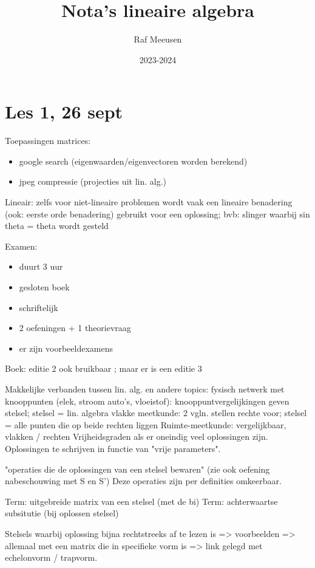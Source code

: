 \documentclass{article}
\title{Nota's lineaire algebra}
\author{Raf Meeusen}
\date{2023-2024}
\begin{document}
\maketitle

\section{Les 1, 26 sept}

Toepassingen matrices: 
\begin{itemize}
\item google search (eigenwaarden/eigenvectoren worden berekend) 
\item jpeg compressie (projecties uit lin. alg.) 
\end{itemize}


Lineair: zelfs voor niet-lineaire problemen wordt vaak een lineaire benadering (ook: eerste orde benadering) gebruikt voor een oplossing; bvb: slinger waarbij sin theta = theta wordt gesteld

Examen: 
\begin{itemize}
\item duurt 3 uur
\item gesloten boek
\item schriftelijk
\item 2 oefeningen + 1 theorievraag
\item er zijn voorbeeldexamens 
\end{itemize}



Boek: editie 2 ook bruikbaar ; maar er is een editie 3 

Makkelijke verbanden tussen lin. alg. en andere topics: 
fysisch netwerk met knooppunten (elek, stroom auto's, vloeistof): knooppuntvergelijkingen geven stelsel; stelsel = lin. algebra
vlakke meetkunde: 2 vgln. stellen rechte voor; stelsel = alle punten die op beide rechten liggen
Ruimte-meetkunde: vergelijkbaar, vlakken / rechten
Vrijheidsgraden als er oneindig veel oplossingen zijn. Oplossingen te schrijven in functie van "vrije parameters". 

"operaties die de oplossingen van een stelsel bewaren" 
(zie ook oefening nabeschouwing met S en S') 
Deze operaties zijn per definities omkeerbaar.  

Term: uitgebreide matrix van een stelsel (met de bi) 
Term: achterwaartse subsitutie (bij oplossen stelsel) 

Stelsels waarbij oplossing bijna rechtstreeks af te lezen is => voorbeelden => allemaal met een matrix die in specifieke vorm is => link gelegd met echelonvorm / trapvorm. 
\end{document}
